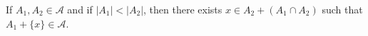 If $A_1, A_2 \in \mathcal{A}$ and if $|A_1| < |A_2|$, then there exists $x \in A_2 + (A_1 \cap A_2)$ such that $A_1 + \{x\} \in \mathcal{A}$.
